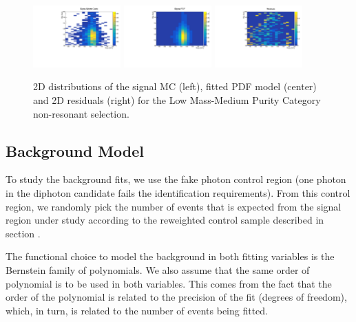 \begin{figure}[h]
  \centering
\includegraphics[width=0.3\textwidth]{figures/sec-signals/SignalResiduals/h_mc_LM_cat1}\hfil
\includegraphics[width=0.3\textwidth]{figures/sec-signals/SignalResiduals/h_pd_LM_cat1}\hfil
\includegraphics[width=0.3\textwidth]{figures/sec-signals/SignalResiduals/h_re_LM_cat1}\hfil
  \caption{2D distributions of the signal MC (left), fitted PDF model (center) and 2D residuals (right) for the Low Mass-Medium Purity Category non-resonant selection.}
  \label{fig:sig_resi_lm_mpc}
\end{figure}



\subsection{Background Model}

To study the background fits, we use the fake photon control region (one photon in the diphoton candidate fails the identification requirements). From this control region, we randomly pick the number of events that is expected from the signal region under study according to the reweighted control sample described in section \label{sec:cats}.

The functional choice to model the background in both fitting variables is the Bernstein family of polynomials. 
We also assume that the same order of polynomial is to be used in both variables. 
This comes from the fact that the order of the polynomial is related to the precision of the fit (degrees of freedom), which, in turn, is related to the number of events being fitted. 

